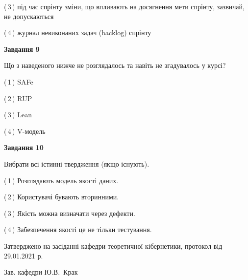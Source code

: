 \documentclass[10pt, ukrainian]{article}
\begin{document}
{\begin {large}
(\,3\,) під час спрінту зміни, що впливають на досягнення мети спрінту, зазвичай, не допускаються%



(\,4\,) журнал невиконаних задач (backlog) спрінту%


{\begin {center}\textbf{Завдання 9}\end {center}}\par
Що з наведеного нижче не розглядалось та навіть не згадувалось у курсі?\par
\vspace{2mm}



(\,1\,) SAFe%



(\,2\,) RUP%



(\,3\,) Lean%



(\,4\,) V-модель%


{\begin {center}\textbf{Завдання 10}\end {center}}\par
Вибрати всі істинні твердження (якщо існують).\par
\vspace{2mm}



(\,1\,) Розглядають модель якості даних.%



(\,2\,) Користувачі бувають вторинними.%



(\,3\,) Якість можна визначати через дефекти.%



(\,4\,) Забезпечення якості це не тільки тестування.%



\end {large}}
{\vspace{5mm}\smallskip \begin {small} Затверджено на засіданні кафедри теоретичної кібернетики, протокол  від   29.01.2021 р.\par\smallskip\smallskip
{\parbox {6.5 cm}{Зав. кафедри \dotfill Ю.В.~Крак}} \end{small}}
\newpage
\end{document}
